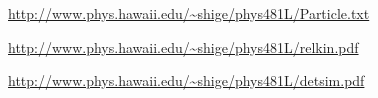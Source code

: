\documentclass[aps,prl,twocolumn,superscriptaddress,nofootinbib]{revtex4-1}
\begin{document}
\setlength{\parindent}{0cm}

\begin{thebibliography}{99}  %

 \url{http://www.phys.hawaii.edu/~shige/phys481L/Particle.txt}    %

 \url{http://www.phys.hawaii.edu/~shige/phys481L/relkin.pdf}

 \url{http://www.phys.hawaii.edu/~shige/phys481L/detsim.pdf}




\end{thebibliography}
\end{document}
